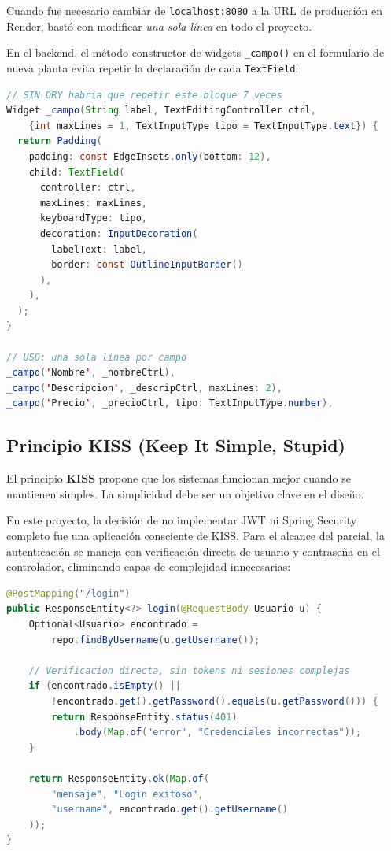 \documentclass[12pt,a4paper]{article}
\begin{document}
Cuando fue necesario cambiar de \texttt{localhost:8080} a la URL de producción en Render, bastó con modificar \textit{una sola línea} en todo el proyecto.

En el backend, el método constructor de widgets \texttt{\_campo()} en el formulario de nueva planta evita repetir la declaración de cada \texttt{TextField}:

\begin{lstlisting}[style=dartstyle, language=Java, caption=Método auxiliar que elimina repetición en formularios]
// SIN DRY habria que repetir este bloque 7 veces
Widget _campo(String label, TextEditingController ctrl,
    {int maxLines = 1, TextInputType tipo = TextInputType.text}) {
  return Padding(
    padding: const EdgeInsets.only(bottom: 12),
    child: TextField(
      controller: ctrl,
      maxLines: maxLines,
      keyboardType: tipo,
      decoration: InputDecoration(
        labelText: label,
        border: const OutlineInputBorder()
      ),
    ),
  );
}

// USO: una sola linea por campo
_campo('Nombre', _nombreCtrl),
_campo('Descripcion', _descripCtrl, maxLines: 2),
_campo('Precio', _precioCtrl, tipo: TextInputType.number),
\end{lstlisting}

\subsection{Principio KISS (Keep It Simple, Stupid)}

El principio \textbf{KISS} propone que los sistemas funcionan mejor cuando se mantienen simples. La simplicidad debe ser un objetivo clave en el diseño.

En este proyecto, la decisión de no implementar JWT ni Spring Security completo fue una aplicación consciente de KISS. Para el alcance del parcial, la autenticación se maneja con verificación directa de usuario y contraseña en el controlador, eliminando capas de complejidad innecesarias:

\begin{lstlisting}[style=javastyle, language=Java, caption=Autenticación simple y directa (principio KISS)]
@PostMapping("/login")
public ResponseEntity<?> login(@RequestBody Usuario u) {
    Optional<Usuario> encontrado =
        repo.findByUsername(u.getUsername());

    // Verificacion directa, sin tokens ni sesiones complejas
    if (encontrado.isEmpty() ||
        !encontrado.get().getPassword().equals(u.getPassword())) {
        return ResponseEntity.status(401)
            .body(Map.of("error", "Credenciales incorrectas"));
    }

    return ResponseEntity.ok(Map.of(
        "mensaje", "Login exitoso",
        "username", encontrado.get().getUsername()
    ));
}
\end{lstlisting}
\end{document}
